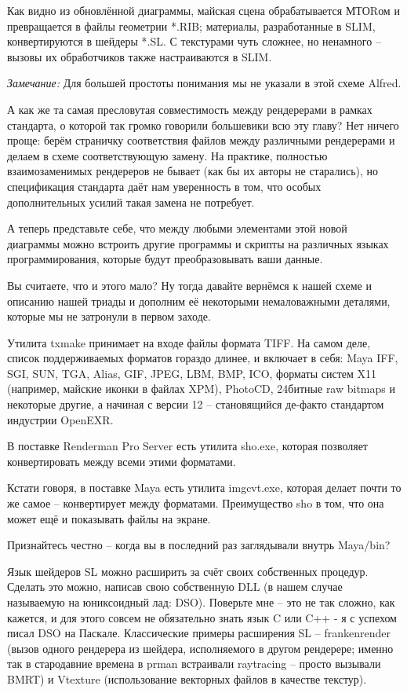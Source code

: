  

Как видно из обновлённой диаграммы, майская сцена
   обрабатывается МТОRом и превращается в файлы геометрии *.RIB;
   материалы, разработанные в SLIM, конвертируются в шейдеры *.SL. С
   текстурами чуть сложнее, но ненамного – вызовы их обработчиков
   также настраиваются в SLIM.
 

{\it Замечание:} Для большей простоты
   понимания мы не указали в этой схеме Alfred.
 

А как же та самая пресловутая совместимость между
   рендерерами в рамках стандарта, о которой так громко говорили
   большевики всю эту главу? Нет ничего проще: берём страничку
   соответствия файлов между различными рендерерами и делаем в схеме
   соответствующую замену. На практике, полностью взаимозаменимых
   рендереров не бывает (как бы их авторы не старались), но
   спецификация стандарта даёт нам уверенность в том, что особых
   дополнительных усилий такая замена не потребует.
 

А теперь представьте себе, что между любыми
   элементами этой новой диаграммы можно встроить другие программы и
   скрипты на различных языках программирования, которые будут
   преобразовывать ваши данные.
 

Вы считаете, что и этого мало? Ну тогда давайте
   вернёмся к нашей схеме и описанию нашей триады и дополним её
   некоторыми немаловажными деталями, которые мы не затронули в первом
   заходе.
 
    Утилита txmake принимает на входе файлы формата
     TIFF. На самом деле, список поддерживаемых форматов гораздо длинее,
     и включает в себя: Maya IFF, SGI, SUN, TGA, Alias, GIF, JPEG, LBM,
     BMP, ICO, форматы систем X11 (например, майские иконки в файлах
     XPM), PhotoCD, 24битные raw bitmaps и некоторые другие, а начиная с
     версии 12 – становящийся де-факто стандартом индустрии
     OpenEXR.

    В поставке Renderman Pro Server есть утилита
     sho.exe, которая позволяет конвертировать между всеми этими
     форматами.

     Кстати говоря, в поставке Maya есть утилита imgcvt.exe, которая
     делает почти то же самое – конвертирует между форматами.
     Преимущество sho в том, что она может ещё и показывать файлы на
     экране.

     Признайтесь честно – когда вы в последний раз заглядывали внутрь
     Maya/bin?

    Язык шейдеров SL можно расширить за счёт своих
     собственных процедур. Сделать это можно, написав свою собственную
     DLL (в нашем случае называемую на юниксоидный лад: DSO). Поверьте
     мне – это не так сложно, как кажется, и для этого совсем не
     обязательно знать язык C или C++ - я с успехом писал DSO на
     Паскале. Классические примеры расширения SL – frankenrender (вызов
     одного рендерера из шейдера, исполняемого в другом рендерере;
     именно так в стародавние времена в prman встраивали raytracing –
     просто вызывали BMRT) и Vtexture (использование векторных файлов в
     качестве текстур).

